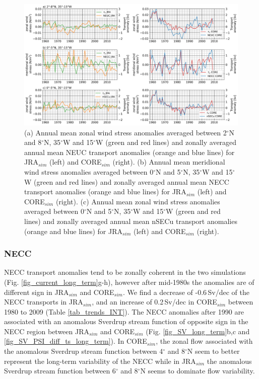 \documentclass[os, manuscript]{copernicus}
\begin{document}
	\begin{figure}[t]
		\includegraphics[width=12cm]{../../figures/paper/f12_wind_stress_current_correlation.png}
		\caption{(a) Annual mean zonal wind stress anomalies averaged between 2$^{\circ}$N and 8$^{\circ}$N, 35$^{\circ}$W and 15$^{\circ}$W (green and red lines) and zonally averaged annual mean NEUC transport anomalies (orange and blue lines) for JRA$_{sim}$ (left) and CORE$_{sim}$ (right).
			(b) Annual mean meridional wind stress anomalies averaged between 0$^{\circ}$N and 5$^{\circ}$N, 35$^{\circ}$W and 15$^{\circ}$W (green and red lines) and zonally averaged annual mean NECC transport anomalies (orange and blue lines) for JRA$_{sim}$ (left) and CORE$_{sim}$ (right).
			(c) Annual mean zonal wind stress anomalies averaged between 0$^{\circ}$N and 5$^{\circ}$N, 35$^{\circ}$W and 15$^{\circ}$W (green and red lines) and zonally averaged annual mean nSECu transport anomalies (orange and blue lines) for JRA$_{sim}$ (left) and CORE$_{sim}$ (right).}
		\label{fig_wind_stress_current_corr}
	\end{figure}
	
	\subsubsection{NECC}
	NECC transport anomalies tend to be zonally coherent in the two simulations (Fig. \ref{fig_current_long_term}g-h), however after mid-1980s the anomalies are of different sign in JRA$_{sim}$ and CORE$_{sim}$. We find a decrease of -0.6$\,$Sv/dec of the NECC transports in JRA$_{sim}$, and an increase of 0.2$\,$Sv/dec in CORE$_{sim}$ between 1980 to 2009 (Table \ref{tab_trends_INT}). The NECC anomalies after 1990 are associated with an anomalous Sverdrup stream function of opposite sign in the NECC region between JRA$_{sim}$ and CORE$_{sim}$ (Fig. \ref{fig_SV_long_term}b,c and \ref{fig_SV_PSI_diff_ts_long_term}). In CORE$_{sim}$, the zonal flow associated with the anomalous Sverdrup stream function between 4$^{\circ}$ and 8$^{\circ}$N seem to better represent the long-term variability of the NECC while in JRA$_{sim}$ the anomalous Sverdrup stream function between 6$^{\circ}$ and 8$^{\circ}$N seems to dominate flow variability.
	
\end{document}
